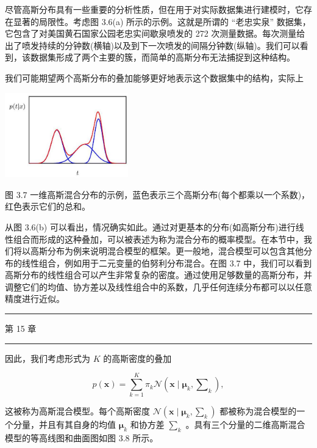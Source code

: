 \documentclass[10pt]{article}
\newcommand{\HRule}{\begin{center}\rule{0.9\linewidth}{0.2mm}\end{center}}
\begin{document}
尽管高斯分布具有一些重要的分析性质，但在用于对实际数据集进行建模时，它存在显著的局限性。考虑图 3.6(a) 所示的示例。这就是所谓的 “老忠实泉” 数据集，它包含了对美国黄石国家公园老忠实间歇泉喷发的 272 次测量数据。每次测量给出了喷发持续的分钟数(横轴)以及到下一次喷发的间隔分钟数(纵轴)。我们可以看到，该数据集形成了两个主要的簇，而简单的高斯分布无法捕捉到这种结构。

我们可能期望两个高斯分布的叠加能够更好地表示这个数据集中的结构，实际上

\begin{center}
\includegraphics[max width=0.4\textwidth]{images/0194e279-9b28-703a-88f4-c3ac21e2010d_106_1020_344_531_365_0.jpg}
\end{center}
\hspace*{3em} 

图 3.7 一维高斯混合分布的示例，蓝色表示三个高斯分布(每个都乘以一个系数)，红色表示它们的总和。

从图 3.6(b) 可以看出，情况确实如此。通过对更基本的分布(如高斯分布)进行线性组合而形成的这种叠加，可以被表述为称为混合分布的概率模型。在本节中，我们将以高斯分布为例来说明混合模型的框架。更一般地，混合模型可以包含其他分布的线性组合，例如用于二元变量的伯努利分布混合。在图 3.7 中，我们可以看到高斯分布的线性组合可以产生非常复杂的密度。通过使用足够数量的高斯分布，并调整它们的均值、协方差以及线性组合中的系数，几乎任何连续分布都可以以任意精度进行近似。

\HRule

第 15 章

\HRule

因此，我们考虑形式为 \(K\) 的高斯密度的叠加

\[
p\left( \mathbf{x}\right)  = \mathop{\sum }\limits_{{k = 1}}^{K}{\pi }_{k}\mathcal{N}\left( {\mathbf{x} \mid  {\mathbf{\mu }}_{k},{\mathbf{\sum }}_{k}}\right) , \tag{3.111}
\]

这被称为高斯混合模型。每个高斯密度 \(\mathcal{N}\left( {\mathbf{x} \mid  {\mathbf{\mu }}_{k},{\mathbf{\sum }}_{k}}\right)\) 都被称为混合模型的一个分量，并且有其自身的均值 \({\mathbf{\mu }}_{k}\) 和协方差 \({\mathbf{\sum }}_{k}\) 。具有三个分量的二维高斯混合模型的等高线图和曲面图如图 3.8 所示。
\end{document}
